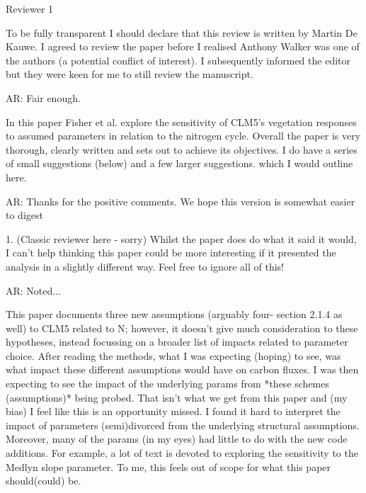 \documentclass{article}
\begin{document}
\textsf{Reviewer 1}

To be fully transparent I should declare that this review is written by Martin De Kauwe. I agreed to review the paper before I realised Anthony Walker was one of the authors (a potential conflict of interest). I subsequently informed the editor but they were keen for me to still review the manuscript. 

\textsf{AR: Fair enough.}

In this paper Fisher et al. explore the sensitivity of CLM5's vegetation responses to assumed parameters in relation to the nitrogen cycle. Overall the paper is very thorough, clearly written and sets out to achieve its objectives. I do have a series of small suggestions (below) and a few larger suggestions. which I would outline here. 

\textsf{AR: Thanks for the positive comments. We hope this version is somewhat easier to digest}

1. (Classic reviewer here - sorry) Whilst the paper does do what it said it would, I can't help thinking this paper could be more interesting if it presented the analysis in a slightly different way. Feel free to ignore all of this! 

\textsf{AR: Noted...}

This paper documents three new assumptions (arguably four- section 2.1.4 as well) to CLM5 related to N; however, it doesn't give much consideration to these hypotheses, instead focussing on a broader list of impacts related to parameter choice. After reading the methods, what I was expecting (hoping) to see, was what impact these different assumptions would have on carbon fluxes. I was then expecting to see the impact of the underlying params from *these schemes (assumptions)* being probed. That isn't what we get from this paper and (my bias) I feel like this is an opportunity missed. I found it hard to interpret the impact of parameters (semi)divorced from the underlying structural assumptions. Moreover, many of the params (in my eyes) had little to do with the new code additions. For example, a lot of text is devoted to exploring the sensitivity to the Medlyn slope parameter. To me, this feels out of scope for what this paper should(could) be. 
\end{document}
